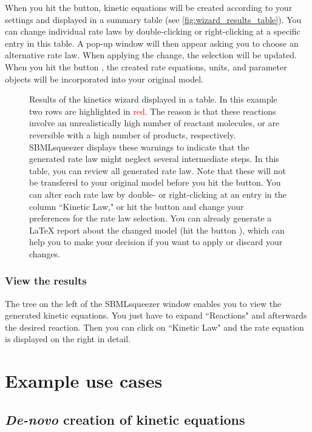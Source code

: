 When you hit the  button, kinetic equations will be created according to your settings and displayed in a summary table (see \vref{fig:wizard_results_table}).
You can change individual rate laws by double-clicking or right-clicking at a specific entry in this table.
A pop-up window will then appear asking you to choose an alternative rate law.
When applying the change, the selection will be updated.
When you hit the button , the created rate equations, units, and parameter objects will be incorporated into your original model.
\begin{figure}
\caption{Results of the kinetics wizard displayed in a table.
In this example two rows are highlighted in \textcolor{red}{red}.
The reason is that these reactions involve an unrealistically high number of reactant molecules, or are reversible with a high number of products, respectively.
SBMLsqueezer displays these warnings to indicate that the generated rate law might neglect several intermediate steps.
In this table, you can review all generated rate law.
Note that these will not be transfered to your original model before you hit the  button.
You can alter each rate law by double- or right-clicking at an entry in the column ``Kinetic Law," or hit the  button and change your preferences for the rate law selection.
You can already generate a \LaTeX{} report about the changed model (hit the button ), which can help you to make your decision if you want to apply or discard your changes.}
\label{fig:wizard_results_table}
\end{figure}

\subsection{View the results}

The tree on the left of the SBMLsqueezer window enables you to view the generated kinetic equations.
You just have to expand ``Reactions" and afterwards the desired reaction.
Then you can click on ``Kinetic Law" and the rate equation is displayed on the right in detail.


\chapter{Example use cases}

\section{\emph{De-novo} creation of kinetic equations}
